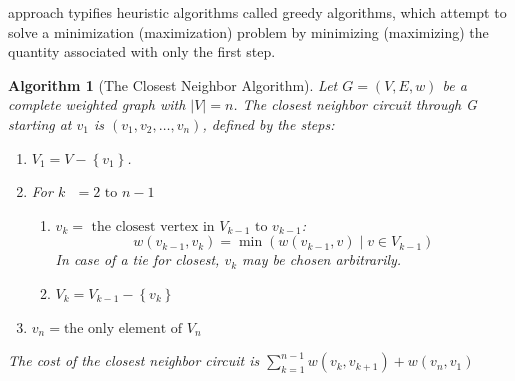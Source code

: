 \documentclass[10pt,]{book}
\theoremstyle{plain}
\newtheorem{algorithm}[theorem]{Algorithm}
\theoremstyle{definition}
\theoremstyle{definition}
\theoremstyle{definition}
\theoremstyle{definition}
\theoremstyle{definition}
\numberwithin{equation}{section}
\begin{document}
approach typifies heuristic algorithms called  greedy algorithms, which attempt to solve a minimization (maximization) problem
by minimizing (maximizing) the quantity associated with only the first step.%
\begin{algorithm}[The Closest Neighbor Algorithm]\label{alg-closest-neighbor}
Let \(G = (V, E, w)\) be a complete weighted graph with \(|V| = n\). The closest neighbor
circuit through G starting at \(v_1\) is \(\left(v_1, v_2,\ldots ,v_n\right)\), defined by the steps:%
\par
\leavevmode%
\begin{enumerate}[label=\arabic*]
\item\hypertarget{li-67}{} \(V_1= V-\left\{v_1\right\}\).%
\item\hypertarget{li-68}{}For \(k\text{  }= 2  \textrm{ to } n - 1\) %
\par
%
\begin{enumerate}[label=\alph*]
\item\hypertarget{li-69}{} \(v_k= \textrm{ the closest vertex in } V_{k-1} \textrm{ to }
						 v_{k-1}\):
	 \[w\left(v_{k-1} , v _k\right) = \min  \left(w\left(v_{k-1} ,v\right) \mid v \in  V_{k-1}\right)\] 
 In case of a tie for closest, \(v_k\) may be chosen arbitrarily.%
\item\hypertarget{li-70}{} \(V_k= V_{k-1} - \left\{v_k \right\}\)%
\end{enumerate}
%
\item\hypertarget{li-71}{}\(v_n= \textrm{the only element of } V_n\)%
\end{enumerate}
%
\par
The cost of the closest neighbor circuit is
\(\sum_{k=1}^{n-1} w\left(v_k,v_{k+1}\right)+w\left(v_n,v_1\right)\)%
\end{algorithm}
\end{document}
